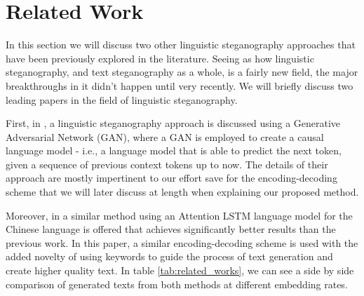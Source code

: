 \documentclass[journal,onecolumn]{IEEEtran}
\begin{document}
\section{Related Work}
In this section we will discuss two other linguistic steganography approaches that have been previously explored in the literature.
Seeing as how linguistic steganography, and text steganography as a whole, is a fairly new field, the major breakthroughs in it didn't happen until very recently.
We will briefly discuss two leading papers in the field of linguistic steganography.

First, in \cite{yang2020gan}, a linguistic steganography approach is discussed using a Generative Adversarial Network (GAN), where a GAN is employed to create
a causal language model - i.e., a language model that is able to predict the next token, given a sequence of previous context tokens up to now. The details of their approach
are mostly impertinent to our effort save for the encoding-decoding scheme that we will later discuss at length when explaining our proposed
method.

Moreover, in \cite{kang2020generative} a similar method using an Attention LSTM language model for the Chinese language is offered that achieves significantly better results
than the previous work. In this paper, a similar encoding-decoding scheme is used with the added novelty of using keywords to guide the process of
text generation and create higher quality text. In table \ref{tab:related_works}, we can see a side by side comparison of generated texts from both methods at different embedding rates.
\end{document}

